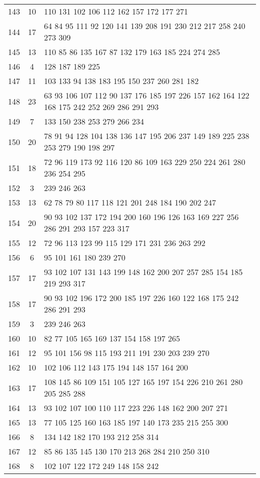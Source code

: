 \documentclass{standalone}
\begin{document}
\begin{tabular}{c c l}
143 & 10 & 110 131 102 106 112 162 157 172 177 271 \\
144 & 17 & 64 84 95 111 92 120 141 139 208 191 230 212 217 258 240 273 309 \\
145 & 13 & 110 85 86 135 167 87 132 179 163 185 224 274 285 \\
146 & 4 & 128 187 189 225 \\
147 & 11 & 103 133 94 138 183 195 150 237 260 281 182 \\
148 & 23 & 63 93 106 107 112 90 137 176 185 197 226 157 162 164 122 168 175 242 252 269 286 291 293 \\
149 & 7 & 133 150 238 253 279 266 234 \\
150 & 20 & 78 91 94 128 104 138 136 147 195 206 237 149 189 225 238 253 279 190 198 297 \\
151 & 18 & 72 96 119 173 92 116 120 86 109 163 229 250 224 261 280 236 254 295 \\
152 & 3 & 239 246 263 \\
153 & 13 & 62 78 79 80 117 118 121 201 248 184 190 202 247 \\
154 & 20 & 90 93 102 137 172 194 200 160 196 126 163 169 227 256 286 291 293 157 223 317 \\
155 & 12 & 72 96 113 123 99 115 129 171 231 236 263 292 \\
156 & 6 & 95 101 161 180 239 270 \\
157 & 17 & 93 102 107 131 143 199 148 162 200 207 257 285 154 185 219 293 317 \\
158 & 17 & 90 93 102 196 172 200 185 197 226 160 122 168 175 242 286 291 293 \\
159 & 3 & 239 246 263 \\
160 & 10 & 82 77 105 165 169 137 154 158 197 265 \\
161 & 12 & 95 101 156 98 115 193 211 191 230 203 239 270 \\
162 & 10 & 102 106 112 143 175 194 148 157 164 200 \\
163 & 17 & 108 145 86 109 151 105 127 165 197 154 226 210 261 280 205 285 288 \\
164 & 13 & 93 102 107 100 110 117 223 226 148 162 200 207 271 \\
165 & 13 & 77 105 125 160 163 185 197 140 173 235 215 255 300 \\
166 & 8 & 134 142 182 170 193 212 258 314 \\
167 & 12 & 85 86 135 145 130 170 213 268 284 210 250 310 \\
168 & 8 & 102 107 122 172 249 148 158 242 \\

\end{tabular}
\end{document}
